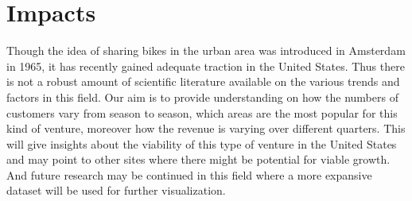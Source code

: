 \section{Impacts}
\label{sec:impact}
Though the idea of sharing bikes in the urban area was introduced in Amsterdam in 1965, it has recently gained adequate traction in the United States. 
Thus there is not a robust amount of scientific literature available on the various trends and factors in this field. 
Our aim is to provide understanding on how the numbers of customers vary from season to season, which areas are the most popular for this kind of venture, moreover how the revenue is varying over different quarters. 
This will give insights about the viability of this type of venture in the United States and may point to other sites where there might be potential for viable growth.
And future research may be continued in this field where a more expansive dataset will be used for further visualization.